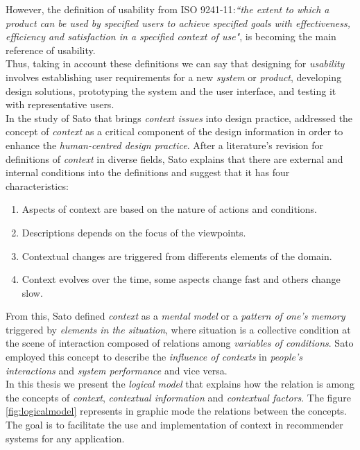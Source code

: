 However, the definition of usability from ISO
9241-11\cite{international1998iso}:\textit{``the extent to which a
product can be used by specified users to achieve specified  goals
with effectiveness, efficiency and satisfaction in a  specified
context of use"}, is becoming the main reference of usability. \\
Thus, taking in account these definitions we can say that designing for 
\textit{usability} involves establishing user requirements for a new
\textit{system} or \textit{product}, developing design solutions,
prototyping the system and the user interface, and testing it with
representative users.\\
In the study of Sato\cite{sato2004context} that brings \textit{context
issues} into design practice, addressed the concept of
\textit{context} as a critical component of the design information in
order to enhance the \textit{human-centred design practice}. After a
literature's revision for  definitions of \textit{context} in diverse
fields, Sato explains that there are external and internal conditions
into the definitions and suggest that it has four characteristics:
\begin{enumerate}  
\item Aspects of context are based on the nature of actions and 
conditions.
\item Descriptions depends on the focus of the viewpoints.
\item Contextual changes are triggered from differents elements 
of the domain. 
\item Context evolves over the time, some aspects change fast
and others change slow. 
\end{enumerate} 
From this, Sato defined \textit{context} as a \textit{mental model} or a
\textit{pattern of one's memory} triggered by \textit{elements in the
situation}, where situation is a collective condition at the scene of
interaction composed of relations among \textit{variables of
conditions}. Sato employed this concept to describe the
\textit{influence of contexts} in \textit{people's interactions} and
\textit{system performance} and vice versa.\\
In this thesis we present the \textit{logical model} that explains how
the relation is among the concepts of \textit{context},
\textit{contextual information} and \textit{contextual factors}. The
figure \ref{fig:logicalmodel} represents in graphic mode the relations
between the concepts. The goal is to facilitate the use and
implementation of context in recommender systems for any application.\\
